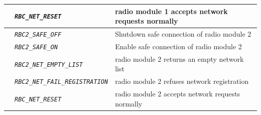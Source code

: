 \documentclass{template/openetcs}
\begin{document}
\begin{itemize}
\begin{longtable}{|l|l|l|}
				\hline
				
				&	\begin{minipage}[t]{0.40\linewidth} \emph{\texttt{RBC\_NET\_RESET}} \end{minipage}
				&	\begin{minipage}[t]{0.38\linewidth} radio module 1 accepts network requests normally \end{minipage} \\
				
				\hline
				
				&	\begin{minipage}[t]{0.40\linewidth} \emph{\texttt{RBC2\_SAFE\_OFF}} \end{minipage}
				&	\begin{minipage}[t]{0.38\linewidth} Shutdown safe connection of radio module 2 \end{minipage} \\ 
				
				\hline
				
				&	\begin{minipage}[t]{0.40\linewidth} \emph{\texttt{RBC2\_SAFE\_ON}} \end{minipage}
				&	\begin{minipage}[t]{0.38\linewidth} Enable safe connection of radio module 2 \end{minipage} \\
				
				\hline 
				
				&	\begin{minipage}[t]{0.40\linewidth} \emph{\texttt{RBC2\_NET\_EMPTY\_LIST}} \end{minipage}
				&	\begin{minipage}[t]{0.38\linewidth} radio module 2 returns an empty network list \end{minipage} \\
				
				\hline
				
				&	\begin{minipage}[t]{0.40\linewidth} \emph{\texttt{RBC2\_NET\_FAIL\_REGISTRATION}} \end{minipage}
				&	\begin{minipage}[t]{0.38\linewidth} radio module 2 refuses network registration \end{minipage} \\
				
				\hline
				
				&	\begin{minipage}[t]{0.40\linewidth} \emph{\texttt{RBC\_NET\_RESET}} \end{minipage}
				&	\begin{minipage}[t]{0.38\linewidth} radio module 2 accepts network requests normally \end{minipage}\\
				

\end{longtable}
\end{itemize}
\end{document}
